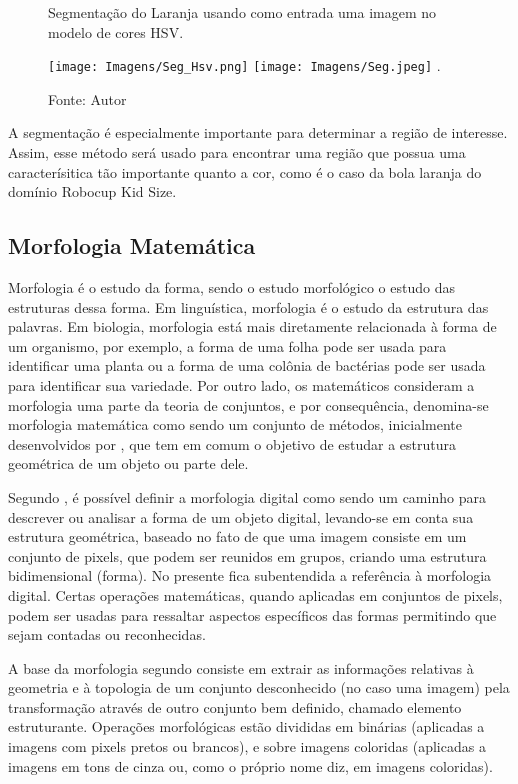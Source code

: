 \begin{figure}[!h]
\centering \caption{Segmentação do Laranja usando como entrada uma imagem no modelo de cores HSV.}
\texttt{[image: Imagens/Seg\_Hsv.png]}
\texttt{[image: Imagens/Seg.jpeg]}
\DeclareGraphicsExtensions.
\caption*{Fonte: Autor}
\label{Fig:Seg}
\end{figure}

A segmentação é especialmente importante para determinar a região de interesse. Assim, esse método será usado para encontrar uma região que possua uma caracterísitica tão importante quanto a cor, como é o caso da bola laranja do domínio Robocup Kid Size.


\subsection{Morfologia Matemática}

Morfologia é o estudo da forma, sendo o estudo morfológico o estudo das estruturas dessa forma. Em linguística, morfologia é o estudo da estrutura das palavras. Em biologia, morfologia está mais diretamente relacionada à forma de um organismo, por exemplo, a forma de uma folha pode ser usada para identificar uma planta ou a forma de uma colônia de bactérias pode ser usada para identificar sua variedade.
Por outro lado, os matemáticos consideram a morfologia uma parte da teoria de conjuntos, e por consequência, denomina-se morfologia matemática como sendo um conjunto de métodos, inicialmente desenvolvidos por , que tem em comum o objetivo de estudar a estrutura geométrica de um objeto ou parte dele. 

Segundo , é possível definir a morfologia digital como sendo um caminho para descrever ou analisar a forma de um objeto digital, levando-se em conta sua estrutura geométrica, baseado no fato de que uma imagem consiste em um conjunto de pixels, que podem ser reunidos em grupos, criando uma estrutura bidimensional (forma). No presente fica subentendida a referência à morfologia digital. Certas operações matemáticas, quando aplicadas em conjuntos de pixels, podem ser usadas para ressaltar aspectos específicos das formas permitindo que sejam contadas ou reconhecidas.

A base da morfologia segundo  consiste em extrair as informações relativas à geometria e à topologia de um conjunto desconhecido (no caso uma imagem) pela transformação através de outro conjunto bem definido, chamado elemento estruturante. Operações morfológicas estão divididas em binárias (aplicadas a imagens com pixels pretos ou brancos), e sobre imagens coloridas (aplicadas a imagens em tons de cinza ou, como o próprio nome diz, em imagens coloridas).

